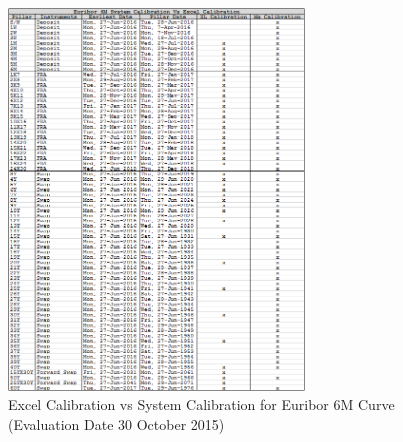\begin{figure}
\centering
\includegraphics[width=0.7\textwidth]{images/10.png}
\caption{Excel Calibration vs System Calibration for Euribor 6M Curve (Evaluation Date 30 October 2015)}
\label{fig:10}
\end{figure}
